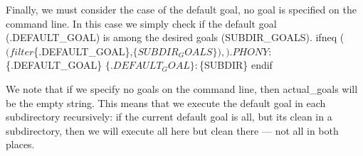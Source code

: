 Finally, we must consider the case of the default goal, \ie no goal is 
specified on the command line.
In this case we simply check if the default goal ({\Tt{}.DEFAULT{\_}GOAL\nwendquote}) is among 
the desired goals ({\Tt{}SUBDIR{\_}GOALS\nwendquote}).
\nwenddocs{}\plusendmoddef\nwstartdeflinemarkup{}\nwenddeflinemarkup
ifneq ($(filter $\{.DEFAULT_GOAL\},$\{SUBDIR_GOALS\}),)
.PHONY: $\{.DEFAULT_GOAL\}
$\{.DEFAULT_GOAL\}: $\{SUBDIR\}
endif
\nwendcode{}

%
%
%
%
We note that if we specify no goals on the command line, then 
{\Tt{}actual{\_}goals\nwendquote} will be the empty string.
This means that we execute the default goal in each subdirectory recursively: 
\eg if the current default goal is {\Tt{}all\nwendquote}, but its {\Tt{}clean\nwendquote} in a 
subdirectory, then we will execute {\Tt{}all\nwendquote} here but {\Tt{}clean\nwendquote} there --- not 
{\Tt{}all\nwendquote} in both places.
\nwenddocs{}
